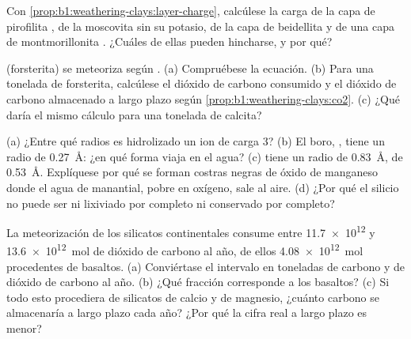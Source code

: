 \begin{exercise}[$\star\star$]\label{exo:b1:weathering-clays:8}
Con \cref{prop:b1:weathering-clays:layer-charge}, calcúlese la carga de la capa de
pirofilita , de la moscovita  sin su potasio, de la capa de
beidellita  y de una capa de montmorillonita
. ¿Cuáles de ellas pueden hincharse, y por qué?
\end{exercise}

\begin{exercise}[$\star\star$]\label{exo:b1:weathering-clays:9}
 (forsterita) se meteoriza según
. (a) Compruébese la
ecuación. (b) Para una tonelada de forsterita, calcúlese el dióxido de carbono consumido y el
dióxido de carbono almacenado a largo plazo según
\cref{prop:b1:weathering-clays:co2}. (c) ¿Qué daría el mismo cálculo para una tonelada de calcita?
\end{exercise}

\begin{exercise}[$\star\star\star$]\label{exo:b1:weathering-clays:10}
(a) ¿Entre qué radios es hidrolizado un ion de carga 3? (b) El boro, , tiene un radio de
\qty{0.27}{\angstrom}: ¿en qué forma viaja en el agua? (c)  tiene un radio de
\qty{0.83}{\angstrom},  de \qty{0.53}{\angstrom}. Explíquese por qué se forman costras negras de óxido de manganeso donde el agua de
manantial, pobre en oxígeno, sale al aire. (d) ¿Por qué el silicio no puede ser ni lixiviado por completo ni conservado por completo?
\end{exercise}

\begin{exercise}[$\star\star\star$]\label{exo:b1:weathering-clays:11}
La meteorización de los silicatos continentales consume entre \num{11.7e12} y
\qty{13.6e12}{mol} de dióxido de carbono al año, de ellos \qty{4.08e12}{mol} procedentes de
basaltos. (a) Conviértase el intervalo en toneladas de carbono y de dióxido de carbono al año. (b) ¿Qué fracción corresponde a los basaltos?
(c) Si todo esto procediera de silicatos de calcio y de magnesio, ¿cuánto carbono se almacenaría a largo plazo cada año? ¿Por qué la cifra real a
largo plazo es menor?
\end{exercise}

